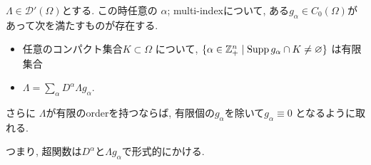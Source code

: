 \begin{tcolorbox}[mybox]
\begin{thm}\cite[Theorem 6.28]{Rud}
\label{thm-H-2.6}
\(\Lambda \in \mathcal{D}'(\Omega)\)とする.
この時任意の \(\alpha\); multi-indexについて, ある\(g_\alpha \in C_0(\Omega)\)があって次を満たすものが存在する. 
\begin{itemize}
\item 任意のコンパクト集合\( K \subset \Omega\) について,  \(\{\alpha \in \mathbb{Z}_+^n \mid \mathrm{Supp}\, g_\alpha \cap K \neq \varnothing \}\) は有限集合
\item \(\Lambda = \sum_\alpha D^\alpha \Lambda g_\alpha\).
\end{itemize}
さらに \(\Lambda\)が有限のorderを持つならば, 有限個の$g_{\alpha}$を除いて\(g_\alpha \equiv 0\) となるように取れる. 
\end{thm}
\end{tcolorbox}
つまり, 超関数は$D^\alpha$と$\Lambda g_\alpha$で形式的にかける. 
